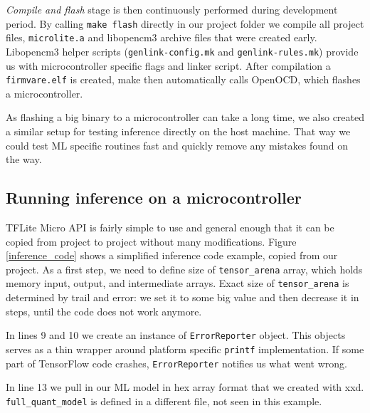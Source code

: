 
\textit{Compile and flash} stage is then continuously performed during development period.
By calling \verb|make flash| directly in our project folder we compile all project files, \verb|microlite.a| and libopencm3 archive files that were created early.
Libopencm3 helper scripts (\verb|genlink-config.mk| and \verb|genlink-rules.mk|) provide us with microcontroller specific flags and linker script.
After compilation a \verb|firmvare.elf| is created, make then automatically calls OpenOCD, which flashes a microcontroller.

As flashing a big binary to a microcontroller can take a long time, we also created a similar setup for testing inference directly on the host machine.
That way we could test ML specific routines fast and quickly remove any mistakes found on the way.


\subsection{ Running inference on a microcontroller}

TFLite Micro API is fairly simple to use and general enough that it can be copied from project to project without many modifications.
Figure \ref{inference_code} shows a simplified inference code example, copied from our project.
As a first step, we need to define size of \verb|tensor_arena| array, which holds memory input, output, and intermediate arrays.
Exact size of \verb|tensor_arena| is determined by trail and error: we set it to some big value and then decrease it in steps, until the code does not work anymore.

In lines 9 and 10 we create an instance of \verb|ErrorReporter| object.
This objects serves as a thin wrapper around platform specific \verb|printf| implementation.
If some part of TensorFlow code crashes, \verb|ErrorReporter| notifies us what went wrong.

In line 13 we pull in our ML model in hex array format that we created with xxd.
\verb|full_quant_model| is defined in a different file, not seen in this example.

